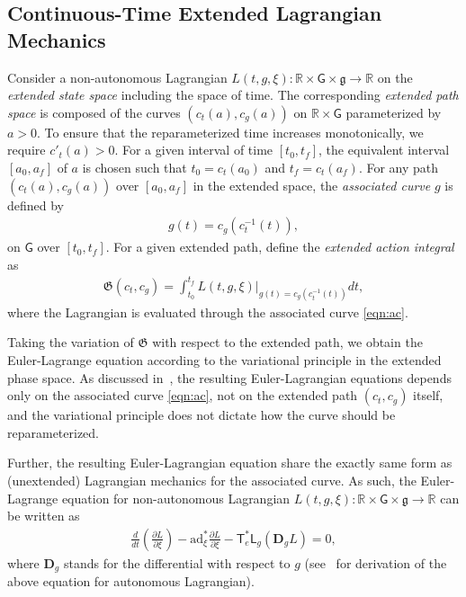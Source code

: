 \documentclass[letterpaper, 10pt, conference]{ieeeconf}
\newcommand{\parenth}[1]{\ensuremath{\left( #1 \right)}}
\newcommand{\deriv}[2]{\ensuremath{\frac{\partial #1}{\partial #2}}}
\newcommand{\G}{\ensuremath{\mathsf{G}}}
\newcommand{\T}{\ensuremath{\mathsf{T}}}
\renewcommand{\L}{\ensuremath{\mathsf{L}}}
\renewcommand{\Re}{\ensuremath{\mathbb{R}}}
\newcommand{\D}{\ensuremath{\mathbf{D}}}
\newcommand{\ad}{\ensuremath{\mathrm{ad}}}
\newcommand{\g}{\ensuremath{\mathfrak{g}}}
\begin{document}
\subsection{Continuous-Time Extended Lagrangian Mechanics}


Consider a non-autonomous Lagrangian $L(t,g,\xi):\Re\times\G\times\g\rightarrow \Re$ on the \textit{extended state space} including the space of time.
The corresponding \textit{extended path space} is composed of the curves $(c_t(a),c_g(a))$ on $\Re\times \G$ parameterized by $a>0$.
To ensure that the reparameterized time increases monotonically, we require $c'_t(a) > 0$. 
For a given interval of time $[t_0,t_f]$, the equivalent interval $[a_0,a_f]$ of $a$ is chosen such that $t_0=c_t(a_0)$ and $t_f=c_t(a_f)$.
For any path $(c_t(a),c_g(a))$ over $[a_0,a_f]$ in the extended space, the \textit{associated curve} $g$ is defined by
\begin{align}
    g(t) = c_g(c_t^{-1}(t)),\label{eqn:ac}
\end{align}
on $\G$ over $[t_0,t_f]$.
For a given extended path, define the \textit{extended action integral} as
\begin{align}
    \mathfrak{G}(c_t,c_g) = \int_{t_0}^{t_f} L(t,g,\xi)\bigg|_{g(t) = c_g(c_t^{-1}(t))} dt,\label{eqn:AI}
\end{align}
where the Lagrangian is evaluated through the associated curve \eqref{eqn:ac}.

Taking the variation of $\mathfrak{G}$ with respect to the extended path, we obtain the Euler-Lagrange equation according to the variational principle in the extended phase space. 
As discussed in~\cite[Sec. 4.2.2]{MarWesAN01}, the resulting Euler-Lagrangian equations depends only on the associated curve \eqref{eqn:ac}, not on the extended path $(c_t,c_g)$ itself, and the variational principle does not dictate how the curve should be reparameterized. 

Further, the resulting Euler-Lagrangian equation share the exactly same form as (unextended) Lagrangian mechanics for the associated curve. 
As such, the Euler-Lagrange equation for non-autonomous Lagrangian $L(t,g,\xi):\Re\times\G\times\g\rightarrow \Re$ can be written as
\begin{align}
    \frac{d}{dt}\!\parenth{\deriv{L}{\xi}} - \ad^*_\xi \deriv{L}{\xi} - \T^*_e \L_g (\D_g L) = 0,
\end{align}
where $\D_g$ stands for the differential with respect to $g$ (see~\cite[Sec. 8.6.3]{LeeLeo17} for derivation of the above equation for autonomous Lagrangian).
\end{document}
